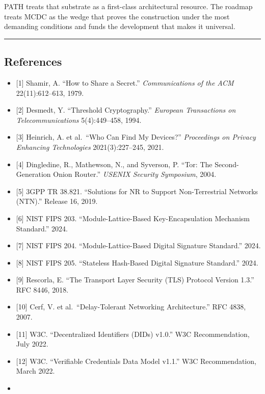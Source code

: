\documentclass[
  11pt,
]{article}
\providecommand{\tightlist}{%
  \setlength{\itemsep}{0pt}\setlength{\parskip}{0pt}}
\begin{document}
PATH treats that substrate as a first-class architectural resource. The
roadmap treats MCDC as the wedge that proves the construction under the
most demanding conditions and funds the development that makes it
universal.

\begin{center}\rule{0.5\linewidth}{0.5pt}\end{center}

\hypertarget{references}{%
\subsection{References}\label{references}}

\begin{itemize}
\tightlist
\item
  {[}1{]} Shamir, A. ``How to Share a Secret.'' \emph{Communications of
  the ACM} 22(11):612--613, 1979.
\item
  {[}2{]} Desmedt, Y. ``Threshold Cryptography.'' \emph{European
  Transactions on Telecommunications} 5(4):449--458, 1994.
\item
  {[}3{]} Heinrich, A. et al.~``Who Can Find My Devices?''
  \emph{Proceedings on Privacy Enhancing Technologies} 2021(3):227--245,
  2021.
\item
  {[}4{]} Dingledine, R., Mathewson, N., and Syverson, P. ``Tor: The
  Second-Generation Onion Router.'' \emph{USENIX Security Symposium},
  2004.
\item
  {[}5{]} 3GPP TR 38.821. ``Solutions for NR to Support Non-Terrestrial
  Networks (NTN).'' Release 16, 2019.
\item
  {[}6{]} NIST FIPS 203. ``Module-Lattice-Based Key-Encapsulation
  Mechanism Standard.'' 2024.
\item
  {[}7{]} NIST FIPS 204. ``Module-Lattice-Based Digital Signature
  Standard.'' 2024.
\item
  {[}8{]} NIST FIPS 205. ``Stateless Hash-Based Digital Signature
  Standard.'' 2024.
\item
  {[}9{]} Rescorla, E. ``The Transport Layer Security (TLS) Protocol
  Version 1.3.'' RFC 8446, 2018.
\item
  {[}10{]} Cerf, V. et al.~``Delay-Tolerant Networking Architecture.''
  RFC 4838, 2007.
\item
  {[}11{]} W3C. ``Decentralized Identifiers (DIDs) v1.0.'' W3C
  Recommendation, July 2022.
\item
  {[}12{]} W3C. ``Verifiable Credentials Data Model v1.1.'' W3C
  Recommendation, March 2022.
\item

\end{itemize}
\end{document}
